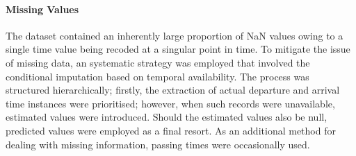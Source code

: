 \paragraph{Missing Values}\label{sec: missing values} The dataset contained an inherently large proportion of NaN values owing to a single time value being recoded at a singular point in time. To mitigate the issue of missing data, an systematic strategy was employed that involved the conditional imputation based on temporal availability. The process was structured hierarchically; firstly, the extraction of actual departure and arrival time instances were prioritised; however, when such records were unavailable, estimated values were introduced. Should the estimated values also be null, predicted values were employed as a final resort. As an additional method for dealing with missing information, passing times were occasionally used.
